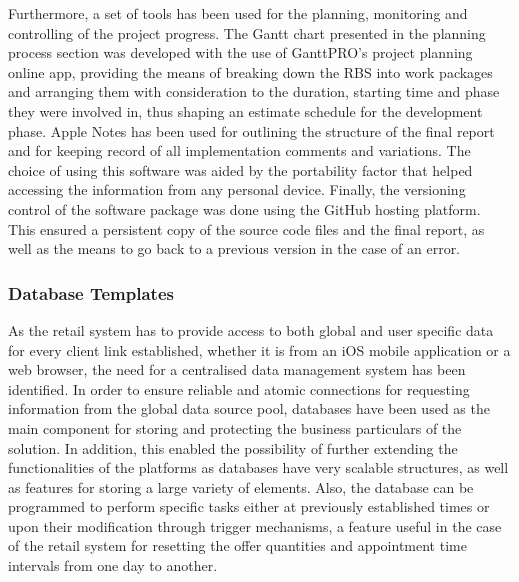 Furthermore, a set of tools has been used for the planning, monitoring and controlling of the project progress. The Gantt chart presented in the planning process section was developed with the use of GanttPRO's project planning online app, providing the means of breaking down the RBS into work packages and arranging them with consideration to the duration, starting time and phase they were involved in, thus shaping an estimate schedule for the development phase\cite{ganttpro_2017}. Apple Notes has been used for outlining the structure of the final report and for keeping record of all implementation comments and variations\cite{notes_2017}. The choice of using this software was aided by the portability factor that helped accessing the information from any personal device. Finally, the versioning control of the software package was done using the GitHub hosting platform\cite{github_2017}. This ensured a persistent copy of the source code files and the final report, as well as the means to go back to a previous version in the case of an error.\\

\subsubsection{Database Templates}

As the retail system has to provide access to both global and user specific data for every client link established, whether it is from an iOS mobile application or a web browser, the need for a centralised data management system has been identified. In order to ensure reliable and atomic connections for requesting information from the global data source pool, databases have been used as the main component for storing and protecting the business particulars of the solution. In addition, this enabled the possibility of further extending the functionalities of the platforms as databases have very scalable structures, as well as features for storing a large variety of elements\cite{what_is_database}. Also, the database can be programmed to perform specific tasks either at previously established times or upon their modification through trigger mechanisms, a feature useful in the case of the retail system for resetting the offer quantities and appointment time intervals from one day to another.\\

